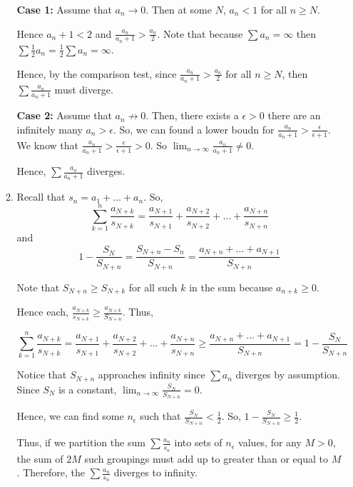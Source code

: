 \documentclass[12pt]{article}
\begin{document}
\begin{enumerate}[start=1,label={\bfseries Problem \arabic*:},leftmargin=1in]
\begin{enumerate}
        \textbf{Case 1:} Assume that $a_{n} \rightarrow 0$. Then at some $N$, $a_{n} < 1$ for all $n \geq N$. 

        Hence $a_{n} + 1 < 2$ and $\frac{a_{n}}{a_{n}+1} > \frac{a_{n}}{2}$. 
        Note that because $\sum a_{n} = \infty$ then $\sum \frac{1}{2} a_{n} = \frac{1}{2} \sum a_n = \infty$. 

        Hence, by the comparison test, since $\frac{a_{n}}{a_{n}+1} > \frac{a_{n}}{2}$ for all $n \geq N$, then $\sum \frac{a_{n}}{a_{n}+1}$ must diverge. 

        \textbf{Case 2:} Assume that $a_{n} \not \rightarrow 0$. Then, there exists a $\epsilon > 0$ there are an infinitely many $a_{n} > \epsilon$. 
        So, we can found a lower boudn for $\frac{a_{n}}{a_{n} + 1} > \frac{\epsilon}{\epsilon + 1}$. We know that $\frac{a_{n}}{a_{n} + 1} > \frac{\epsilon}{\epsilon + 1} > 0$. So $\lim_{ n \to \infty} \frac{a_{n}}{a_{n} + 1} \neq 0$. 

        Hence, $\sum \frac{a_{n}}{a_{n} + 1}$ diverges. 

        \item Recall that $s_{n} = a_{1} + ... + a_{n}$. 
        So, 
        \[ 
            \sum^{n}_{k=1}\frac{a_{N+k}}{s_{N+k}} = \frac{a_{N+1}}{s_{N+1}} + \frac{a_{N+2}}{s_{N+2}} + \dots + \frac{a_{N+n}}{s_{N+n}}
        \]
        and 
        \[ 
         1- \frac{S_{N}}{S_{N+n}} = \frac{S_{N+n} - S_{n}}{S_{N+n}} = \frac{a_{N+n} + ... + a_{N+1}}{S_{N+n}}
        \]

        Note that $S_{N + n} \geq S_{N + k}$ for all such $k$ in the sum because $a_{n+k} \geq 0$. 

        Hence each, $\frac{a_{N+k}}{s_{N+k}} \geq \frac{a_{N+k}}{S_{N+n}}$. Thus, 

        \[
            \sum^{n}_{k=1}\frac{a_{N+k}}{s_{N+k}} = \frac{a_{N+1}}{s_{N+1}} + \frac{a_{N+2}}{s_{N+2}} + \dots + \frac{a_{N+n}}{s_{N+n}} \geq \frac{a_{N+n} + ... + a_{N+1}}{S_{N+n}} = 1 - \frac{S_{N}}{S_{N+n}}
        \]

        Notice that $S_{N+n}$ approaches infinity since $\sum a_{n}$ diverges by assumption. Since $S_{N}$ is a constant, $\lim_{n \to \infty} \frac{S_{N}}{S_{N+n}} = 0$. 

        Hence, we can find some $n_{\epsilon}$ such that $\frac{S_{N}}{S_{N+n}} < \frac{1}{2}$. So, $1 - \frac{S_{N}}{S_{N+n}} \geq \frac{1}{2}$. 

        Thus, if we partition the sum $\sum \frac{a_{n}}{s_{n}}$ into sets of $n_{\epsilon}$ values, for any $M > 0$, the sum of $2M$ such groupings must add up to greater than or equal to $M$. 
        Therefore, the $\sum \frac{a_{n}}{s_{n}}$ diverges to infinity. 


\end{enumerate}
\end{enumerate}
\end{document}
